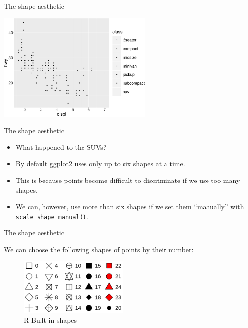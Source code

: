 \documentclass[ignorenonframetext,]{beamer}
\begin{document}
\begin{frame}{The shape aesthetic}
\protect\hypertarget{the-shape-aesthetic-1}{}

\begin{center}\includegraphics[height=200px]{data-visualization_files/figure-beamer/unnamed-chunk-16-1} \end{center}

\end{frame}

\begin{frame}[fragile]{The shape aesthetic}
\protect\hypertarget{the-shape-aesthetic-2}{}

\begin{itemize}
\item
  What happened to the SUVs?
\item
  By default ggplot2 uses only up to six shapes at a time.
\item
  This is because points become difficult to discriminate if we use too
  many shapes.
\item
  We can, however, use more than six shapes if we set them ``manually''
  with \texttt{scale\_shape\_manual()}.
\end{itemize}

\end{frame}

\begin{frame}{The shape aesthetic}
\protect\hypertarget{the-shape-aesthetic-3}{}

We can choose the following shapes of points by their number:

\begin{figure}
\centering
\includegraphics[width=2.08333in,height=\textheight]{figures/shapes-1}
\caption{R Built in shapes}
\end{figure}

\end{frame}
\end{document}
